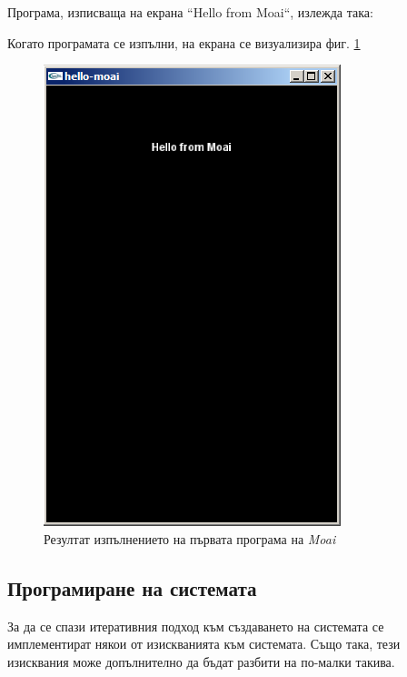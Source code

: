 			\newpage			
			
			Програма, изписваща на екрана ``Hello from Moai``, излежда така:
			
						
			
			Когато програмата се изпълни, на екрана се визуализира фиг. \ref{figure:hello-moai}
			
			\begin{figure} 
				\caption{Резултат изпълнението на първата програма на \emph{Moai}}
				\label{figure:hello-moai}
					\begin{center}
						\includegraphics{assets/images/hello-moai.png}				
					\end{center}
			\end{figure}
			
			\newpage
			
	\subsection{Програмиране на системата}
	
		За да се спази итеративния подход към създаването на системата
		се имплементират някои от изискванията към системата. Също така,
		тези изисквания може допълнително да бъдат разбити на по-малки такива.
		
